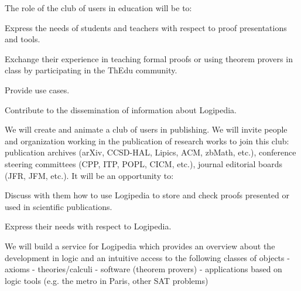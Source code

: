 \begin{workpackage}[id=dissemination,type=MGT,
  short={Dissemination},
  title={Dissemination, communication and exploitation},
  lead=Inr,InrRM=12,BirRM=4,IrtRM=4,ImtRM=2,StrRM=2,ZibRM=14,EduRM=12]
\begin{tasklist}
\begin{task}[id=teachers-club,
      title=Expanding the use of Logipedia in education,
      lead=Str,StrRM=2,wphases=1-48!.05]
    The role of the club of users in education will be to:
    \begin{compactitem}
    \item Express the needs of students and teachers with respect to proof
      presentations and tools.
    \item Exchange their experience in teaching formal proofs or using
      theorem provers in class by participating in the ThEdu community.
    \item Provide use cases.
    \item Contribute to the dissemination of information about Logipedia.
    \end{compactitem}

  \end{task}

  \begin{task}[id=publishers-club,
      title=Expanding the use of Logipedia in publishing,
      lead=Zib,ZibRM=2,wphases=1-48!.05]
    We will create and animate a club of users in publishing. We will invite
    people and organization working in the publication of research
    works to join this club: publication archives (arXiv, CCSD-HAL,
    Lipics, ACM, zbMath, etc.), conference steering committees (CPP,
    ITP, POPL, CICM, etc.), journal editorial boards (JFR, JFM,
    etc.). It will be an opportunity to:
    \begin{compactitem}
    \item Discuss with them how to use Logipedia to store and check
      proofs presented or used in scientific publications.
    \item Express their needs with respect to Logipedia.
    \end{compactitem}
  \end{task}

  \begin{task}[id=zib,
      title=Linking scientific publications to Logipedia,
      lead=Zib,ZibRM=12,wphases=12-23]
    We will build a service for Logipedia which provides an overview
    about the development in logic and an intuitive access to the
    following classes of objects - axioms - theories/calculi -
    software (theorem provers) - applications based on logic tools
    (e.g. the metro in Paris, other SAT problems)


\end{task}
\end{tasklist}
\end{workpackage}
